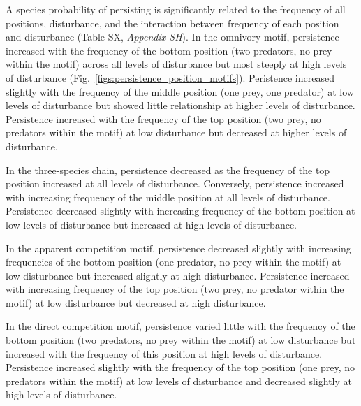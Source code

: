 \documentclass[12pt]{article}
\begin{document}
\begin{spacing}{2.0}
        A species probability of persisting is significantly related to the frequency of all positions, disturbance, and the interaction between frequency of each position and disturbance (Table SX, \emph{Appendix SH}).
        In the omnivory motif, persistence increased with the frequency of the bottom position (two predators, no prey within the motif) across all levels of disturbance but most steeply at high levels of disturbance (Fig.~\ref{figs:persistence_position_motifs}).
        Peristence increased slightly with the frequency of the middle position (one prey, one predator) at low levels of disturbance but showed little relationship at higher levels of disturbance.
        Persistence increased with the frequency of the top position (two prey, no predators within the motif) at low disturbance but decreased at higher levels of disturbance.
        
        
        In the three-species chain, persistence decreased as the frequency of the top position increased at all levels of disturbance.
        Conversely, persistence increased with increasing frequency of the middle position at all levels of disturbance.
        Persistence decreased slightly with increasing frequency of the bottom position at low levels of disturbance but increased at high levels of disturbance.
        
        
        In the apparent competition motif, persistence decreased slightly with increasing frequencies of the bottom position (one predator, no prey within the motif) at low disturbance but increased slightly at high disturbance.
        Persistence increased with increasing frequency of the top position (two prey, no predator within the motif) at low disturbance but decreased at high disturbance.
        
        
        In the direct competition motif, persistence varied little with the frequency of the bottom position (two predators, no prey within the motif) at low disturbance but increased with the frequency of this position at high levels of disturbance.
        Persistence increased slightly with the frequency of the top position (one prey, no predators within the motif) at low levels of disturbance and decreased slightly at high levels of disturbance.
        


\end{spacing}
\end{document}
